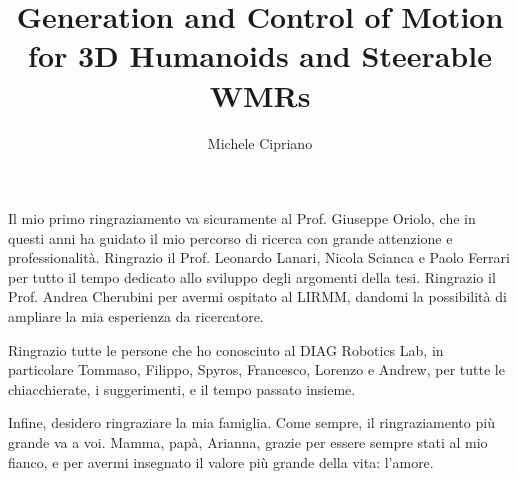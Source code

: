 \documentclass[twoside]{sapthesis}
\title{Generation and Control of Motion for 3D Humanoids and Steerable WMRs}
\author{Michele Cipriano}
\begin{document}
\frontmatter

\maketitle

\begin{acknowledgments}
Il mio primo ringraziamento va sicuramente al Prof. Giuseppe Oriolo, che in
questi anni ha guidato il mio percorso di ricerca con grande attenzione e 
professionalità. Ringrazio il Prof. Leonardo Lanari, Nicola Scianca e Paolo
Ferrari per tutto il tempo dedicato allo sviluppo degli argomenti della tesi.
Ringrazio il Prof. Andrea Cherubini per avermi ospitato al LIRMM, dandomi la 
possibilità di ampliare la mia esperienza da ricercatore.

Ringrazio tutte le persone che ho conosciuto al DIAG Robotics Lab,
in particolare Tommaso, Filippo, Spyros, Francesco, Lorenzo e Andrew,
per tutte le chiacchierate, i suggerimenti, e il tempo passato insieme.

Infine, desidero ringraziare la mia famiglia. Come sempre, il ringraziamento più
grande va a voi. Mamma, papà, Arianna, grazie per essere sempre stati al mio 
fianco, e per avermi insegnato il valore più grande della vita: l'amore.
\end{acknowledgments}
\end{document}
